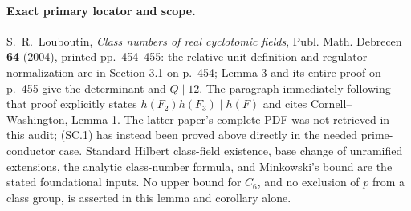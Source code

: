 \paragraph{Exact primary locator and scope.}
S.~R.~Louboutin, \emph{Class numbers of real cyclotomic fields},
Publ. Math. Debrecen \textbf{64} (2004), printed pp.~454--455:
the relative-unit definition and regulator normalization are in
Section 3.1 on p.~454; Lemma 3 and its entire proof on p.~455
give the determinant and $Q\mid12$.
The paragraph immediately following that proof explicitly states
$h(F_2)h(F_3)\mid h(F)$ and cites Cornell--Washington, Lemma 1.
The latter paper's complete PDF was not retrieved in this audit;
(SC.1) has instead been proved above directly in the needed
prime-conductor case.  Standard Hilbert class-field existence,
base change of unramified extensions, the analytic class-number
formula, and Minkowski's bound are the stated foundational inputs.
No upper bound for $C_6$, and no exclusion of $p$ from a class group,
is asserted in this lemma and corollary alone.
